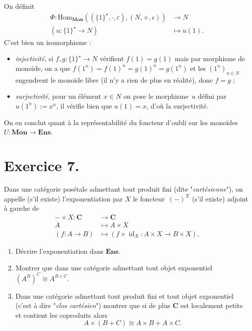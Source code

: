 \documentclass{../../td}
\newcommand\id{\ensuremath{\operatorname{id}}}
\begin{document}
\begin{enumerate}
      On définit
      \begin{align*}
        \Phi: \mathrm{Hom}_{\mathbf{Mon}}((\{1\}^\star, \cdot, \varepsilon), (N, \diamond, \epsilon)) &\longrightarrow N \\
        (u : \{1\}^\star \to N) &\longmapsto u(1)
      .\end{align*}
      C'est bien un isomorphisme :
      \begin{itemize}
        \item \textit{injectivité}, si $f, g : \{1\}^\star \to N$ vérifient $f(1) = g(1)$ mais par morphisme de monoïde, on a que $f(1^n) = f(1)^n = g(1)^n = g(1^n)$ et les  $(1^n)_{n \in N}$ engendrent le monoïde libre (il n'y a rien de plus en réalité), donc $f = g$ ;
        \item \textit{surjectivité}, pour un élément $x \in N$ on pose le morphisme~$u$ défini par $u(1^n) := x^n$, il vérifie bien que $u(1) = x$, d'où la surjectivité.
      \end{itemize}

      On en conclut quant à la représentabilité du foncteur d'oubli sur les monoïdes $U : \mathbf{Mon} \to \mathbf{Ens}$.
  \end{enumerate}

  \chapter{Exercice 7.}

  \begin{slshape}
    \color{deepblue}

    Dans une catégorie posétale admettant tout produit fini (dite "\textit{cartésienne}"), on appelle (s'il existe) l'exponentiation par $X$ le foncteur~$(-)^{X}$ (s'il existe) adjoint à gauche de
    \begin{align*}
      - \times X: \mathbf{C} &\longrightarrow \mathbf{C} \\
      A &\longmapsto A \times X\\
      (f : A \to B) &\longmapsto (f \times \id_X : A \times X \to B \times X)
    .\end{align*}

    \begin{enumerate}
      \item Décrire l'exponentiation dans $\mathbf{Ens}$.
      \item Montrer que dans une catégorie admettant tout objet exponentiel $(A^B)^C \cong A^{B \times C}$.
      \item Dans une catégorie admettant tout produit fini et tout objet exponentiel (c'est à dire "\textit{clos cartésien}") montrer que si de plus $\mathbf{C}$ est localement petite et contient les coproduits alors \[
      A \times (B + C) \cong A \times B + A \times C
      .\]
    \end{enumerate}
  \end{slshape}
\end{document}
